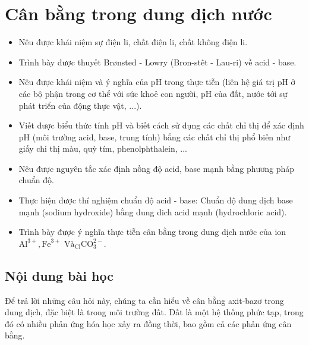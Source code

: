 \section{Cân bằng trong dung dịch nước}
\begin{Muctieu}
	\begin{itemize}
		\item  Nêu được khái niệm sự điện li, chất điện li, chất không điện li.
		\item  Trình bày được thuyết Brønsted - Lowry (Bron-stêt - Lau-ri) về acid - base.
		\item  Nêu được khái niệm và ý nghĩa của pH trong thực tiễn (liên hệ giá trị pH ở các bộ phận trong cơ thể với sức khoẻ con người, pH của đất, nước tới sự phát triển của động thực vật, ...).
		\item  Viết được biểu thức tính pH và biết cách sử dụng các chất chỉ thị để xác định pH (môi trường acid, base, trung tính) bẳng các chất chỉ thị phổ biến như giấy chi thị màu, quỳ tím, phenolphthalein, ...
		\item  Nêu được nguyên tắc xác định nồng độ acid, base mạnh bằng phương pháp chuẩn độ.
		\item  Thực hiện được thí nghiệm chuẩn độ acid - base: Chuẩn độ dung dịch base mạnh (sodium hydroxide) bằng dung dich acid mạnh (hydrochloric acid).
		\item  Trình bày được ý nghĩa thực tiễn cân bằng trong dung dịch nước của ion $\mathrm{Al}^{3+}, \mathrm{Fe}^{3+}$ $\mathrm{Và}_{\mathrm{Cl}} \mathrm{CO}_3^{2-}$.
	\end{itemize}
\end{Muctieu}
\subsection{Nội dung bài học}
\begin{kd}
		Để trả lời những câu hỏi này, chúng ta cần hiểu về cân bằng axit-bazơ trong dung dịch, đặc biệt là trong môi trường đất. Đất là một hệ thống phức tạp, trong đó có nhiều phản ứng hóa học xảy ra đồng thời, bao gồm cả các phản ứng cân bằng.
\end{kd}
